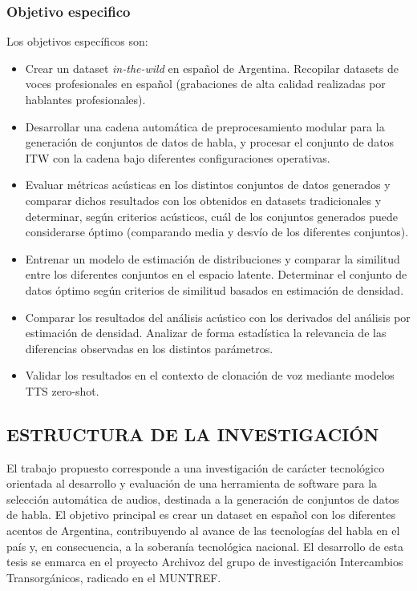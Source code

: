 \subsubsection{Objetivo especifico}

Los objetivos específicos son:

\begin{itemize}
    \item Crear un dataset \emph{in-the-wild} en español de Argentina. Recopilar datasets de voces profesionales en español (grabaciones de alta calidad realizadas por hablantes profesionales).
    \item Desarrollar una cadena automática de preprocesamiento modular para la generación de conjuntos de datos de habla, y procesar el conjunto de datos ITW con la cadena bajo diferentes configuraciones operativas.
    \item Evaluar métricas acústicas en los distintos conjuntos de datos generados y comparar dichos resultados con los obtenidos en datasets tradicionales y determinar, según criterios acústicos, cuál de los conjuntos generados puede considerarse óptimo (comparando media y desvío de los diferentes conjuntos).
    \item Entrenar un modelo de estimación de distribuciones y comparar la similitud entre los diferentes conjuntos en el espacio latente. Determinar el conjunto de datos óptimo según criterios de similitud basados en estimación de densidad.
    \item Comparar los resultados del análisis acústico con los derivados del análisis por estimación de densidad. Analizar de forma estadística la relevancia de las diferencias observadas en los distintos parámetros.
    \item Validar los resultados en el contexto de clonación de voz mediante modelos TTS zero-shot.
\end{itemize}

\subsection{ESTRUCTURA DE LA INVESTIGACIÓN}

El trabajo propuesto corresponde a una investigación de carácter tecnológico orientada al desarrollo y evaluación de una herramienta de software para la selección automática de audios, destinada a la generación de conjuntos de datos de habla. El objetivo principal es crear un dataset en español con los diferentes acentos de Argentina, contribuyendo al avance de las tecnologías del habla en el país y, en consecuencia, a la soberanía tecnológica nacional. El desarrollo de esta tesis se enmarca en el proyecto Archivoz del grupo de investigación Intercambios Transorgánicos, radicado en el MUNTREF.

